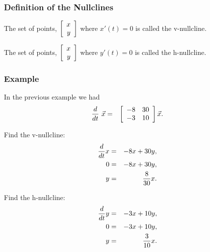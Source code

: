 \begin{frame}
  \frametitle{Definition of the Nullclines}

  \begin{definition}
    The set of points, $\vecTwo{x}{y}$ where $x'(t)=0$ is called the
    v-nullcline. 
  \end{definition}


  \begin{definition}
    The set of points, $\vecTwo{x}{y}$ where $y'(t)=0$ is called the
    h-nullcline.
  \end{definition}


\end{frame}


\begin{frame}
  \frametitle{Example}
  
  In the previous example we had
  \begin{eqnarray*}
    \deriv{~}{t} \vec{x} & = & \arrayTwo{-8}{30}{-3}{10} \vec{x}.
  \end{eqnarray*}

  {
    Find the v-nullcline:
    \begin{eqnarray*}
      \deriv{x}{t} & = & -8x + 30y, \\
      0 & = & -8x + 30y, \\
      y & = & \frac{8}{30} x.
    \end{eqnarray*}
  }

  {
    Find the h-nullcline:
    \begin{eqnarray*}
      \deriv{y}{t} & = & -3x + 10y, \\
      0 & = & -3x + 10y, \\
      y & = &  \frac{3}{10} x.
    \end{eqnarray*}
  }


\end{frame}


